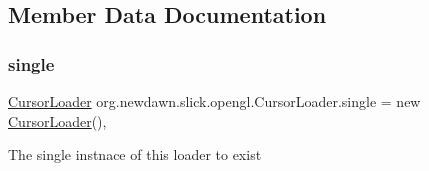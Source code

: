 \subsection{Member Data Documentation}
\mbox{\label{classorg_1_1newdawn_1_1slick_1_1opengl_1_1_cursor_loader_a0550bb212ff0bdb84ff32b244360c40e}} 
\subsubsection{\texorpdfstring{single}{single}}
{\footnotesize\ttfamily \mbox{\hyperlink{classorg_1_1newdawn_1_1slick_1_1opengl_1_1_cursor_loader}{Cursor\+Loader}} org.\+newdawn.\+slick.\+opengl.\+Cursor\+Loader.\+single = new \mbox{\hyperlink{classorg_1_1newdawn_1_1slick_1_1opengl_1_1_cursor_loader}{Cursor\+Loader}}()\hspace{0.3cm}{\ttfamily [static]}, {\ttfamily [private]}}

The single instnace of this loader to exist 
